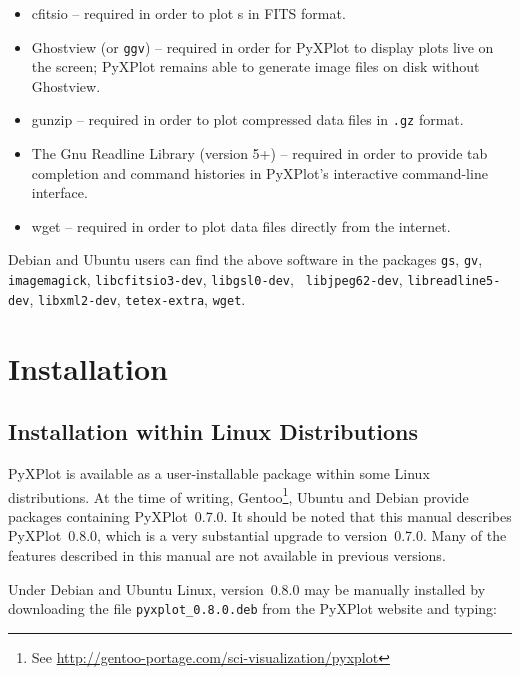 \vspace{0.5cm}
\begin{itemize}
\item cfitsio -- required in order to plot \datafile s in FITS format.
\item Ghostview (or {\tt ggv})  -- required in order for PyXPlot to display plots live on the screen; PyXPlot remains able to generate image files on disk without Ghostview.
\item gunzip  -- required in order to plot compressed data files in {\tt .gz} format.
\item The Gnu Readline Library (version 5+)  -- required in order to provide tab completion and command histories in PyXPlot's interactive command-line interface.
\item wget  -- required in order to plot data files directly from the internet.
\end{itemize}
\vspace{0.5cm}

Debian and Ubuntu users can find the above software in the packages {\tt gs},
{\tt gv}, {\tt imagemagick}, {\tt libcfitsio3-dev}, {\tt libgsl0-dev}, {\tt
libjpeg62-dev}, {\tt libreadline5-dev}, {\tt libxml2-dev}, {\tt tetex-extra},
{\tt wget}.

\section{Installation}

\subsection{Installation within Linux Distributions}

PyXPlot is available as a user-installable package within some Linux
distributions. At the time of writing, Gentoo\footnote{See
\url{http://gentoo-portage.com/sci-visualization/pyxplot}}, Ubuntu and Debian provide packages containing
PyXPlot~0.7.0. It should be noted that this manual describes PyXPlot~0.8.0,
which is a very substantial upgrade to version~0.7.0. Many of the features
described in this manual are not available in previous versions.

Under Debian and Ubuntu Linux, version~0.8.0 may be manually installed by
downloading the file {\tt pyxplot\_0.8.0.deb} from the PyXPlot website and
typing:

